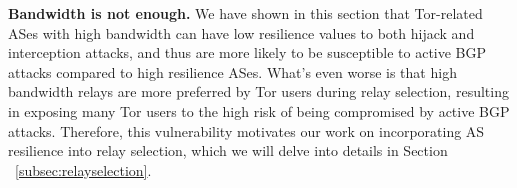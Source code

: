 
{\bf Bandwidth is not enough.} We have shown in this section that Tor-related ASes with high bandwidth can have low resilience values to both hijack and interception attacks, and thus are more likely to be susceptible to active BGP attacks compared to high resilience ASes. What's even worse is that high bandwidth relays are more preferred by Tor users during relay selection, resulting in exposing many Tor users to the high risk of being compromised by active BGP attacks. Therefore, this vulnerability motivates our work on incorporating AS resilience into relay selection, which we will delve into details in Section ~\ref{subsec:relayselection}.



